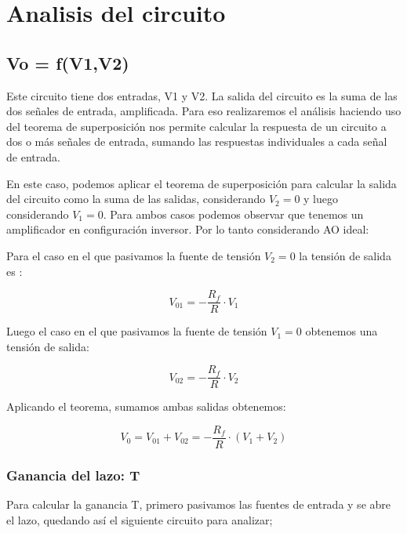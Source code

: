 \section{Analisis del circuito}

\subsection{Vo = f(V1,V2)}

Este circuito tiene dos entradas, V1 y V2. 
La salida del circuito es la suma de las dos señales de entrada, amplificada. Para eso realizaremos el análisis haciendo uso del teorema de superposición nos permite calcular la respuesta de un circuito a dos o más señales de entrada, sumando las respuestas individuales a cada señal de entrada.

En este caso, podemos aplicar el teorema de superposición para calcular la salida del circuito como la suma de las salidas, considerando $V_2=0$ y luego considerando $V_1=0$. Para ambos casos podemos observar que tenemos un amplificador en configuración inversor. Por lo tanto considerando AO ideal: 

\vspace{1em}

Para el caso en el que pasivamos la fuente de tensión $V_2 = 0$ la tensión de salida es :

\[V_{01} = - \frac{R_f}{R} \cdot V_1 \]

Luego el caso en el que pasivamos la fuente de tensión $V_1 = 0$ obtenemos una tensión de salida:

\[V_{02} = - \frac{R_f}{R} \cdot V_2 \]

Aplicando el teorema, sumamos ambas salidas obtenemos:

\[V_{0} = V_{01} + V_{02} = - \frac{R_f}{R} \cdot (V_1 + V_2) \]

\vspace{1em}

\subsubsection{Ganancia del lazo: T}
Para calcular la ganancia T, primero pasivamos las fuentes de entrada y se abre el lazo, quedando así el siguiente circuito para analizar;

